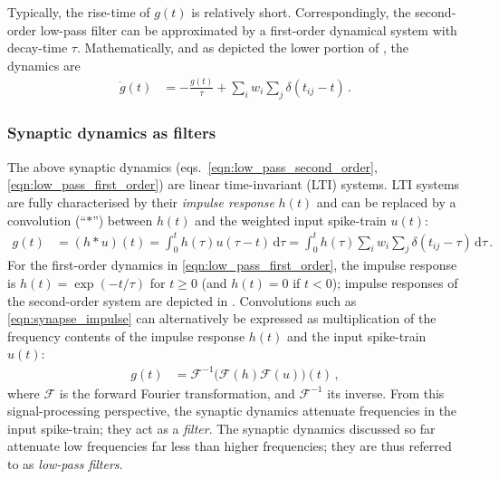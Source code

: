 Typically, the rise-time of $g(t)$ is relatively short.
Correspondingly, the second-order low-pass filter can be approximated by a first-order dynamical system with decay-time $\tau$.
Mathematically, and as depicted the lower portion of , the dynamics are
\begin{align}
	\dot g(t) &= -\frac{g(t)}{\tau} + \sum\nolimits_{i}  w_i \sum\nolimits_{j} \delta(t_{ij} - t) \,.
	\label{eqn:low_pass_first_order}
\end{align}

\subsubsection{Synaptic dynamics as filters}
The above synaptic dynamics (eqs.~\ref{eqn:low_pass_second_order}, \ref{eqn:low_pass_first_order}) are linear time-invariant (LTI) systems.
LTI systems are fully characterised by their \emph{impulse response} $h(t)$ and can be replaced by a convolution (\enquote{$\ast$}) between $h(t)$ and the weighted input spike-train $u(t)$:
\begin{align}
	g(t)
		&= (h \ast u)(t)
		 = \int_0^t h(\tau) u(\tau - t) \,\mathrm{d}\tau
		 = \int_0^t h(\tau) \sum\nolimits_{i}  w_i \sum\nolimits_{j} \delta(t_{ij} - \tau) \,\mathrm{d}\tau \,.
	\label{eqn:synapse_impulse}
\end{align}
For the first-order dynamics in \cref{eqn:low_pass_first_order}, the impulse response is $h(t) = \exp(-t/\tau)$ for $t \geq 0$ (and $h(t)= 0$ if $t < 0$); impulse responses of the second-order system are depicted in .
Convolutions such as \cref{eqn:synapse_impulse} can alternatively be expressed as multiplication of the frequency contents of the impulse response $h(t)$ and the input spike-train $u(t)$:
\begin{align}
	g(t) &= \mathcal{F}^{-1} \bigl(\mathcal{F}(h) \mathcal{F}(u) \bigr)(t) \,,
\end{align}
where $\mathcal{F}$ is the forward Fourier transformation, and $\mathcal{F}^{-1}$ its inverse.
From this signal-processing perspective, the synaptic dynamics attenuate frequencies in the input spike-train; they act as a \emph{filter}.
The synaptic dynamics discussed so far attenuate low frequencies far less than higher frequencies; they are thus referred to as \emph{low-pass filters}.

